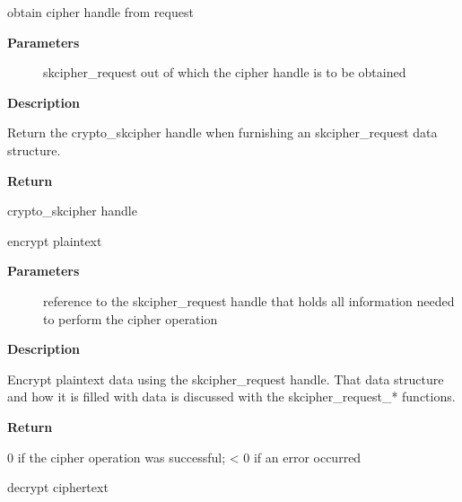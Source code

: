 \documentclass[a4paper,8pt,english]{sphinxmanual}
\begin{document}
\begin{fulllineitems}
\label{crypto/api-skcipher:c.crypto_skcipher_reqtfm}
obtain cipher handle from request

\end{fulllineitems}


\textbf{Parameters}
\begin{description}
\item[{}] \leavevmode
skcipher\_request out of which the cipher handle is to be obtained

\end{description}

\textbf{Description}

Return the crypto\_skcipher handle when furnishing an skcipher\_request
data structure.

\textbf{Return}

crypto\_skcipher handle

\begin{fulllineitems}
\label{crypto/api-skcipher:c.crypto_skcipher_encrypt}
encrypt plaintext

\end{fulllineitems}


\textbf{Parameters}
\begin{description}
\item[{}] \leavevmode
reference to the skcipher\_request handle that holds all information
needed to perform the cipher operation

\end{description}

\textbf{Description}

Encrypt plaintext data using the skcipher\_request handle. That data
structure and how it is filled with data is discussed with the
skcipher\_request\_* functions.

\textbf{Return}

0 if the cipher operation was successful; \textless{} 0 if an error occurred

\begin{fulllineitems}
\label{crypto/api-skcipher:c.crypto_skcipher_decrypt}
decrypt ciphertext

\end{fulllineitems}
\end{document}
